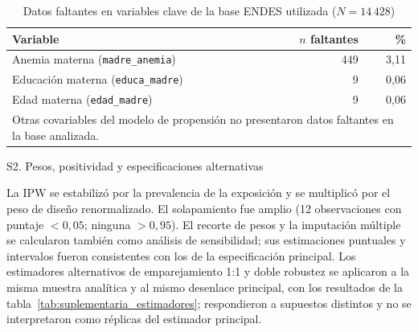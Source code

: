 \documentclass[man,11pt,donotrepeattitle,floatsintext]{apa7}
\makeatletter
\renewcommand{\subsection}{\@startsection{subsection}{2}{\z@}%
    {\b@level@two@skip}{\e@level@two@skip}%
    {\normalfont\normalsize\bfseries\raggedright}}
\makeatother
\begin{document}
\begin{table}[htbp]
\centering
\caption{Datos faltantes en variables clave de la base ENDES utilizada ($N=14\,428$)}
\label{tab:faltantes}
\small
\begin{tabular}{lrr}
\toprule
Variable & $n$ faltantes & \% \\
\midrule
Anemia materna (\texttt{madre\_anemia}) & 449 & 3{,}11 \\
Educación materna (\texttt{educa\_madre}) & 9 & 0{,}06 \\
Edad materna (\texttt{edad\_madre}) & 9 & 0{,}06 \\
\bottomrule
\multicolumn{3}{p{10cm}}{\footnotesize Otras covariables del modelo de propensión no presentaron datos faltantes en la base analizada.} \\
\end{tabular}
\end{table}

\subsection{S2. Pesos, positividad y especificaciones alternativas}

La IPW se estabilizó por la prevalencia de la exposición y se multiplicó por el peso de diseño renormalizado. El solapamiento fue amplio (12 observaciones con puntaje ${}<0{,}05$; ninguna ${}>0{,}95$). El recorte de pesos y la imputación múltiple se calcularon también como análisis de sensibilidad; sus estimaciones puntuales y intervalos fueron consistentes con los de la especificación principal. Los estimadores alternativos de emparejamiento 1:1 y doble robustez se aplicaron a la misma muestra analítica y al mismo desenlace principal, con los resultados de la tabla~\ref{tab:suplementaria_estimadores}; respondieron a supuestos distintos y no se interpretaron como réplicas del estimador principal.
\end{document}
